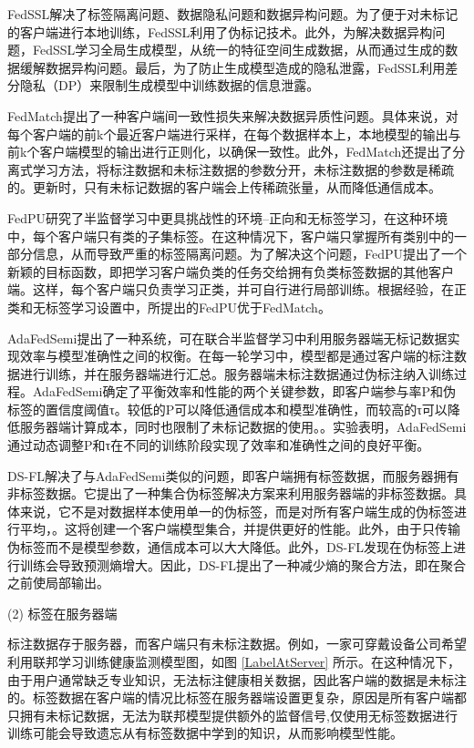 FedSSL\citep{fan2022private}解决了标签隔离问题、数据隐私问题和数据异构问题。为了便于对未标记的客户端进行本地训练，FedSSL利用了伪标记技术。此外，为解决数据异构问题，FedSSL学习全局生成模型，从统一的特征空间生成数据，从而通过生成的数据缓解数据异构问题。最后，为了防止生成模型造成的隐私泄露，FedSSL利用差分隐私（DP）来限制生成模型中训练数据的信息泄露。

FedMatch\citep{jeong2020federated}提出了一种客户端间一致性损失来解决数据异质性问题。具体来说，对每个客户端的前k个最近客户端进行采样，在每个数据样本上，本地模型的输出与前k个客户端模型的输出进行正则化，以确保一致性。此外，FedMatch还提出了分离式学习方法，将标注数据和未标注数据的参数分开，未标注数据的参数是稀疏的。更新时，只有未标记数据的客户端会上传稀疏张量，从而降低通信成本。

FedPU\citep{lin2022federated}研究了半监督学习中更具挑战性的环境--正向和无标签学习，在这种环境中，每个客户端只有类的子集标签。在这种情况下，客户端只掌握所有类别中的一部分信息，从而导致严重的标签隔离问题。为了解决这个问题，FedPU提出了一个新颖的目标函数，即把学习客户端负类的任务交给拥有负类标签数据的其他客户端。这样，每个客户端只负责学习正类，并可自行进行局部训练。根据经验，在正类和无标签学习设置中，所提出的FedPU优于FedMatch。

AdaFedSemi\citep{wang2022enhancing}提出了一种系统，可在联合半监督学习中利用服务器端无标记数据实现效率与模型准确性之间的权衡。在每一轮学习中，模型都是通过客户端的标注数据进行训练，并在服务器端进行汇总。服务器端未标注数据通过伪标注纳入训练过程。AdaFedSemi确定了平衡效率和性能的两个关键参数，即客户端参与率P和伪标签的置信度阈值τ。较低的P可以降低通信成本和模型准确性，而较高的τ可以降低服务器端计算成本，同时也限制了未标记数据的使用。。实验表明，AdaFedSemi通过动态调整P和τ在不同的训练阶段实现了效率和准确性之间的良好平衡。

DS-FL\citep{itahara2021distillation}解决了与AdaFedSemi类似的问题，即客户端拥有标签数据，而服务器拥有非标签数据。它提出了一种集合伪标签解决方案来利用服务器端的非标签数据。具体来说，它不是对数据样本使用单一的伪标签，而是对所有客户端生成的伪标签进行平均，。这将创建一个客户端模型集合，并提供更好的性能。此外，由于只传输伪标签而不是模型参数，通信成本可以大大降低。此外，DS-FL发现在伪标签上进行训练会导致预测熵增大。因此，DS-FL提出了一种减少熵的聚合方法，即在聚合之前使局部输出。

(2) 标签在服务器端

标注数据存于服务器，而客户端只有未标注数据。例如，一家可穿戴设备公司希望利用联邦学习训练健康监测模型图，如图 \ref{LabelAtServer} 所示。在这种情况下，由于用户通常缺乏专业知识，无法标注健康相关数据，因此客户端的数据是未标注的。标签数据在客户端的情况比标签在服务器端设置更复杂，原因是所有客户端都只拥有未标记数据，无法为联邦模型提供额外的监督信号,仅使用无标签数据进行训练可能会导致遗忘从有标签数据中学到的知识，从而影响模型性能\citep{jeong2020federated,diao2022semifl}。

